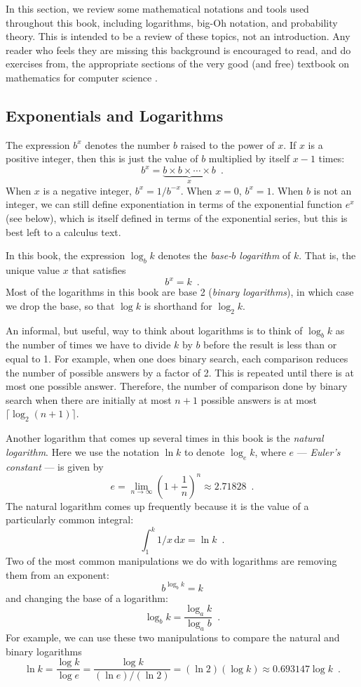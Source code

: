 In this section, we review some mathematical notations and tools
used throughout this book, including logarithms, big-Oh notation, and
probability theory.  This is intended to be a review of these topics, not
an introduction.  Any reader who feels they are missing this background
is encouraged to read, and do exercises from, the appropriate sections
of the very good (and free) textbook on mathematics for computer science
\cite{llm11}.

\subsection{Exponentials and Logarithms}

The expression $b^x$ denotes the number $b$ raised to the power of $x$.
If $x$ is a positive integer, then this is just the value of $b$
multiplied by itself $x-1$ times:
\[
    b^x = \underbrace{b\times b\times \cdots \times b}_{x} \enspace .
\]
When $x$ is a negative integer, $b^x=1/b^{-x}$.  When $x=0$, $b^x=1$.
When $b$ is not an integer, we can still define exponentiation in terms
of the exponential function $e^x$ (see below), which is itself defined in
terms of the exponential series, but this is best left to a calculus text.

In this book, the expression $\log_b k$ denotes the \emph{base-$b$ logarithm}
of $k$.  That is, the unique value $x$ that satisfies
\[
    b^{x} = k  \enspace .
\]
Most of the logarithms in this book are base 2 (\emph{binary logarithms}),
in which case we drop the base, so that $\log k$ is shorthand for
$\log_2 k$.

An informal, but useful, way to think about logarithms is to think
of $\log_b k$ as the number of times we have to divide $k$ by $b$
before the result is less than or equal to 1.  For example, when one
does binary search, each comparison reduces the number of possible
answers by a factor of 2.  This is repeated until there is at most one
possible answer.  Therefore, the number of comparison done by binary
search when there are initially at most $n+1$ possible answers is at
most $\lceil\log_2(n+1)\rceil$.

Another logarithm that comes up several times in this book is the
\emph{natural logarithm}.  Here we use the notation $\ln k$ to denote
$\log_e k$, where $e$ --- \emph{Euler's constant} --- is given by
\[
   e = \lim_{n\rightarrow\infty} \left(1+\frac{1}{n}\right)^n
   \approx  2.71828 \enspace .
\]
The natural logarithm comes up frequently because it is the value
of a particularly common integral:
\[
    \int_{1}^{k} 1/x\,\mathrm{d}x  = \ln k \enspace .
\]
Two of the most common manipulations we do with logarithms are removing
them from an exponent:
\[
    b^{\log_b k} = k
\]
and changing the base of a logarithm:
\[
    \log_b k = \frac{\log_a k}{\log_a b} \enspace .
\]
For example, we can use these two manipulations to compare the natural and binary logarithms
\[
   \ln k = \frac{\log k}{\log e} = \frac{\log k}{(\ln e)/(\ln 2)} = 
    (\ln 2)(\log k) \approx 0.693147\log k \enspace .
\]

